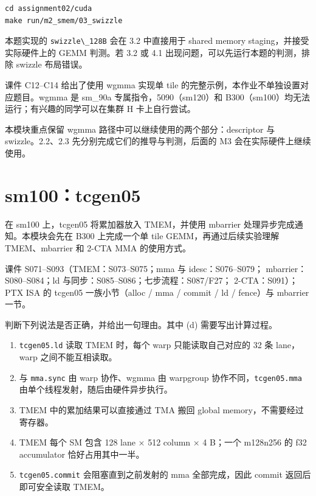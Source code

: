 \documentclass[11pt,a4paper,fontset=none]{ctexart}
\providecommand{\passthrough}[1]{#1}
\begin{document}
\begin{lstlisting}
cd assignment02/cuda
make run/m2_smem/03_swizzle
\end{lstlisting}

本题实现的 \passthrough{\lstinline!swizzle\_128B!} 会在 3.2 中直接用于
shared memory staging，并接受实际硬件上的 GEMM 判测。若 3.2 或 4.1
出现问题，可以先运行本题的判测，排除 swizzle 布局错误。

\begin{lookback}

课件 C12--C14 给出了使用 wgmma 实现单 tile
的完整示例，本作业不单独设置对应题目。wgmma 是 sm\_90a
专属指令，5090（sm120）和
B300（sm100）均无法运行；有兴趣的同学可以在集群 H 卡上自行尝试。

本模块重点保留 wgmma 路径中可以继续使用的两个部分：descriptor 与
swizzle。2.2、2.3 先分别完成它们的推导与判测，后面的 M3
会在实际硬件上继续使用。

\end{lookback}

\section{sm100：tcgen05}\label{sm100tcgen05}

在 sm100 上，tcgen05 将累加器放入 TMEM，并使用 mbarrier
处理异步完成通知。本模块会先在 B300 上完成一个单 tile
GEMM，再通过后续实验理解 TMEM、mbarrier 和 2-CTA MMA 的使用方式。

\begin{reading}

课件 S071--S093（TMEM：S073--S075；mma 与 idesc：S076--S079；
mbarrier：S080--S084；ld 与同步：S085--S086；七步流程：S087/F27；
2-CTA：S091）；PTX ISA 的 tcgen05 一族小节（alloc / mma / commit / ld /
fence）与 mbarrier 一节。

\end{reading}


判断下列说法是否正确，并给出一句理由。其中 (d) 需要写出计算过程。

\begin{enumerate}
\def\labelenumi{(\alph{enumi})}
\item
  \passthrough{\lstinline!tcgen05.ld!} 读取 TMEM 时，每个 warp
  只能读取自己对应的 32 条 lane，warp 之间不能互相读取。
\item
  与 \passthrough{\lstinline!mma.sync!} 由 warp 协作、wgmma 由 warpgroup
  协作不同，\passthrough{\lstinline!tcgen05.mma!}
  由单个线程发射，随后由硬件异步执行。
\item
  TMEM 中的累加结果可以直接通过 TMA 搬回 global
  memory，不需要经过寄存器。
\item
  TMEM 每个 SM 包含 128 lane × 512 column × 4 B；一个 m128n256 的 f32
  accumulator 恰好占用其中一半。
\item
  \passthrough{\lstinline!tcgen05.commit!} 会阻塞直到之前发射的 mma
  全部完成，因此 commit 返回后即可安全读取 TMEM。
\end{enumerate}
\end{document}
